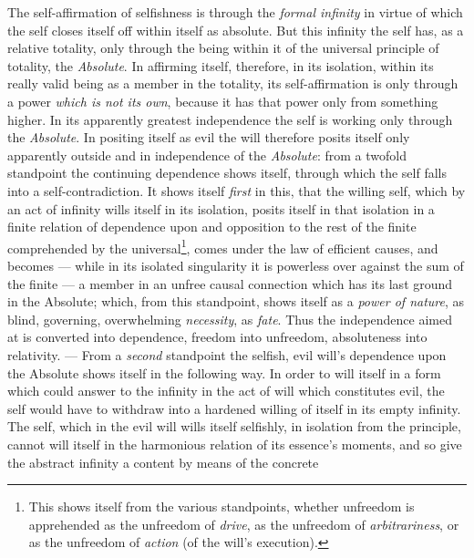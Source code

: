 \documentclass[12pt,a4paper]{book}
\begin{document}
The self-affirmation of selfishness is through the \emph{formal infinity} in
virtue of which the self closes itself off within itself as absolute. But this
infinity the self has, as a relative totality, only through the being within it
of the universal principle of totality, the \emph{Absolute}. In affirming
itself, therefore, in its isolation, within its really valid being as a member
in the totality, its self-affirmation is only through a power \emph{which is not
its own}, because it has that power only from something higher. In its
apparently greatest independence the self is working only through the
\emph{Absolute}. In positing itself as evil the will therefore posits itself
only apparently outside and in independence of the \emph{Absolute}: from a
twofold standpoint the continuing dependence shows itself, through which the
self falls into a self-contradiction. It shows itself \emph{first} in this, that
the willing self, which by an act of infinity wills itself in its isolation,
posits itself in that isolation in a finite relation of dependence upon and
opposition to the rest of the finite comprehended by the
universal\footnote{This shows itself from the various standpoints, whether
unfreedom is apprehended as the unfreedom of \emph{drive}, as the unfreedom of
\emph{arbitrariness}, or as the unfreedom of \emph{action} (of the will's
execution).}, comes under the law of efficient causes, and becomes --- while in
its isolated singularity it is powerless over against the sum of the finite ---
a member in an unfree causal connection which has its last ground in the
Absolute; which, from this standpoint, shows itself as a \emph{power of nature},
as blind, governing, overwhelming \emph{necessity}, as \emph{fate}. Thus the
independence aimed at is converted into dependence, freedom into unfreedom,
absoluteness into relativity. --- From a \emph{second} standpoint the selfish,
evil will's dependence upon the Absolute shows itself in the following way. In
order to will itself in a form which could
answer to the infinity in the act of will which constitutes evil, the self would
have to withdraw into a hardened willing of itself in its empty infinity. The
self, which in the evil will wills itself selfishly, in isolation from the
principle, cannot will itself in the harmonious relation of its essence's
moments, and so give the abstract infinity a content by means of the concrete
\end{document}
